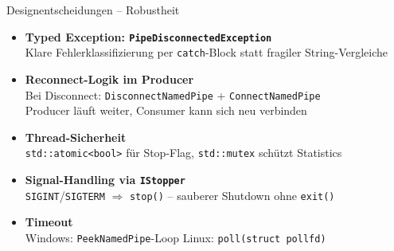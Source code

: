 \documentclass{beamer}
\begin{document}
\begin{frame}{Designentscheidungen -- Robustheit}
\begin{itemize}\setlength{\itemsep}{0.35em}
    \item \textbf{Typed Exception: \texttt{PipeDisconnectedException}}\\
          Klare Fehlerklassifizierung per \texttt{catch}-Block statt fragiler String-Vergleiche

    \item \textbf{Reconnect-Logik im Producer}\\
          Bei Disconnect: \texttt{DisconnectNamedPipe} + \texttt{ConnectNamedPipe}\\
          Producer läuft weiter, Consumer kann sich neu verbinden

    \item \textbf{Thread-Sicherheit}\\
          \texttt{std::atomic<bool>} für Stop-Flag, \texttt{std::mutex} schützt Statistics

    \item \textbf{Signal-Handling via \texttt{IStopper}}\\
          \texttt{SIGINT}/\texttt{SIGTERM} $\Rightarrow$ \texttt{stop()} -- sauberer Shutdown ohne \texttt{exit()}

    \item \textbf{Timeout}\\
          Windows: \texttt{PeekNamedPipe}-Loop \quad Linux: \texttt{poll(struct pollfd)}
\end{itemize}
\end{frame}
\end{document}
